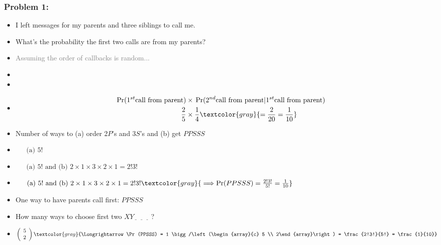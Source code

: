 \documentclass[xcolor={dvipsnames}]{beamer}
\begin{document}
\frame
{
 \frametitle{Problem 1:}
 
\begin{itemize}
\item I left messages for my parents and three siblings to call me.
\item<2->[] What's the probability the first two calls are from my parents?
\item<2->[] \textcolor{gray}{Assuming the order of callbacks is random...}
\item<3->[] 
\item<3->[v1] 
\item<4->[] 
\vspace{-3em}
\footnotesize \begin{align*}
\Pr(1^{st} \text{call from parent}) \times {} & \Pr(2^{nd} \text{call from parent} | 1^{st} \text{call from parent})\\
\frac{2}{5} \times {} & \frac{1}{4} \textcolor{gray}{ = \frac{2}{20} = \frac{1}{10}}
\end{align*}
\item<5->[v2] 
 \footnotesize \hspace{2em} Number of ways to (a) order 2$P$'s and 3$S$'s and (b) get $PPSSS$ 
\vspace{.5em}
\item<6>[] 
\footnotesize $\quad\;\; \text{(a) } 5!$ 
\item<7>[] 
\vspace{-1.25em}
\footnotesize $\quad\;\; \text{(a) } 5! \text{ and (b) } 2\times1\times3\times2\times1 = 2!3!$
\item<8->[] 
\vspace{-1.25em}
\footnotesize $\quad\;\; \text{(a) } 5! \text{ and (b) }  2\times1\times3\times2\times1 = 2!3! \textcolor{gray}{\; \Longrightarrow \Pr(PPSSS) = \frac{2!3!}{5!} = \frac{1}{10}}$
\vspace{1em}
\item<9->[v3] \footnotesize One way to have parents call first: $PPSSS$
\item<10->[] \footnotesize How many ways to choose first two  $XY\underline{\;\;}\;\underline{\;\;}\;\underline{\;\;}\;$?
\item<11->[]
$$ \left(\begin{array}{c} 5 \\ 2\end{array}\right) \textcolor{gray}{\Longrightarrow \Pr(PPSSS) = 1 \bigg/\left(\begin{array}{c} 5 \\ 2\end{array}\right) = \frac{2!3!}{5!} = \frac{1}{10}}$$
\end{itemize}

}
\end{document}
